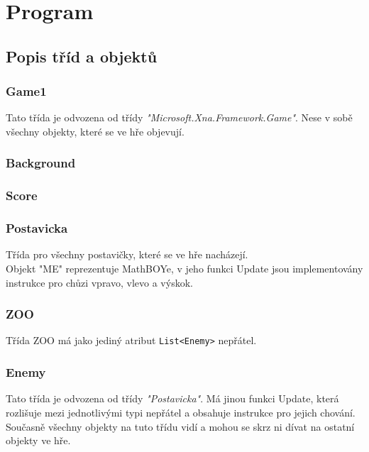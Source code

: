 \documentclass[a4paper,12pt,final]{article}
\begin{document}

\section{Program} %

\subsection{Popis tříd a objektů}

\subsubsection{Game1}

Tato třída je odvozena od třídy \textit{"Microsoft.Xna.Framework.Game"}. Nese v sobě všechny objekty, které se ve hře objevují.

\subsubsection{Background}
\subsubsection{Score}
\subsubsection{Postavicka}

Třída pro všechny postavičky, které se ve hře nacházejí.\\

Objekt "ME" reprezentuje MathBOYe, v jeho funkci Update jsou implementovány instrukce pro chůzi vpravo, vlevo a výskok.

\subsubsection{ZOO}

Třída ZOO má jako jediný atribut \texttt{List<Enemy>} nepřátel.

\subsubsection{Enemy}

Tato třída je odvozena od třídy \textit{"Postavicka"}. Má jinou funkci Update, která rozlišuje mezi jednotlivými typi nepřátel a obsahuje instrukce pro jejich chování. Současně všechny objekty na tuto třídu vidí a mohou se skrz ni dívat na ostatní objekty ve hře.
\end{document}
